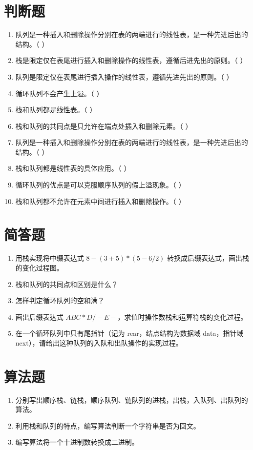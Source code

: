 \documentclass[12pt, a4paper]{article}
\begin{document}
\section*{判断题}

\begin{enumerate}
	\item 队列是一种插入和删除操作分别在表的两端进行的线性表，是一种先进后出的结构。（ ）
	\item 栈是限定仅在表尾进行插入和删除操作的线性表，遵循后进先出的原则。（ ）
	\item 队列是限定仅在表尾进行插入操作的线性表，遵循先进先出的原则。（ ）
	\item 循环队列不会产生上溢。（ ）
	\item 栈和队列都是线性表。（ ）
	\item 栈和队列的共同点是只允许在端点处插入和删除元素。（ ）
	\item 队列是一种插入和删除操作分别在表的两端进行的线性表，是一种先进后出的结构。（ ）
	\item 栈和队列都是线性表的具体应用。（ ）
	\item 循环队列的优点是可以克服顺序队列的假上溢现象。（ ）
	\item 栈和队列都不允许在元素中间进行插入和删除操作。（ ）
\end{enumerate}

\section*{简答题}

\begin{enumerate}
	\item 用栈实现将中缀表达式 $8-(3+5)*(5-6/2)$ 转换成后缀表达式，画出栈的变化过程图。
	\item 栈和队列的共同点和区别是什么？
	\item 怎样判定循环队列的空和满？
	\item 画出后缀表达式 $ABC*D/-E-$，求值时操作数栈和运算符栈的变化过程。
	\item 在一个循环队列中只有尾指针（记为 rear，结点结构为数据域 data，指针域 next），请给出这种队列的入队和出队操作的实现过程。
\end{enumerate}

\section*{算法题}

\begin{enumerate}
	\item 分别写出顺序栈、链栈，顺序队列、链队列的进栈，出栈，入队列、出队列的算法。
	\item 利用栈和队列的特点，编写算法判断一个字符串是否为回文。
	\item 编写算法将一个十进制数转换成二进制。
\end{enumerate}
\end{document}
